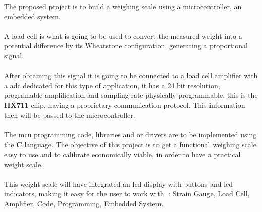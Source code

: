 \begin{secondlangabstract}
\par The proposed project is to build a weighing scale using a microcontroller, an embedded system.
\\
\\
A load cell is what is going to be used to convert the measured weight into a potential difference by its Wheatstone configuration, generating a proportional signal.
\\
\\
After obtaining this signal it is going to be connected to a load cell amplifier with a \ac{adc} dedicated for this type of application, it has a 24 bit resolution, programable amplification and sampling rate physically programmable, this is the \textbf{HX711} chip, having a proprietary communication protocol.
This information then will be passed to the microcontroller.
\\
\\
The \ac{mcu} programming code, libraries and or drivers are to be implemented using the \textbf{C} language. The objective of this project is to get a functional weighing scale easy to use and to calibrate economically viable, in order to have a practical weight scale.
\\
\\
This weight scale will have integrated an \acs{lcd} display with buttons and \acs{led} indicators, making it easy for the user to work with.
\vfill
\noindent
\textbf{\keywordslabel}: Strain Gauge, Load Cell, Amplifier, Code, Programming, Embedded System.
\end{secondlangabstract}
